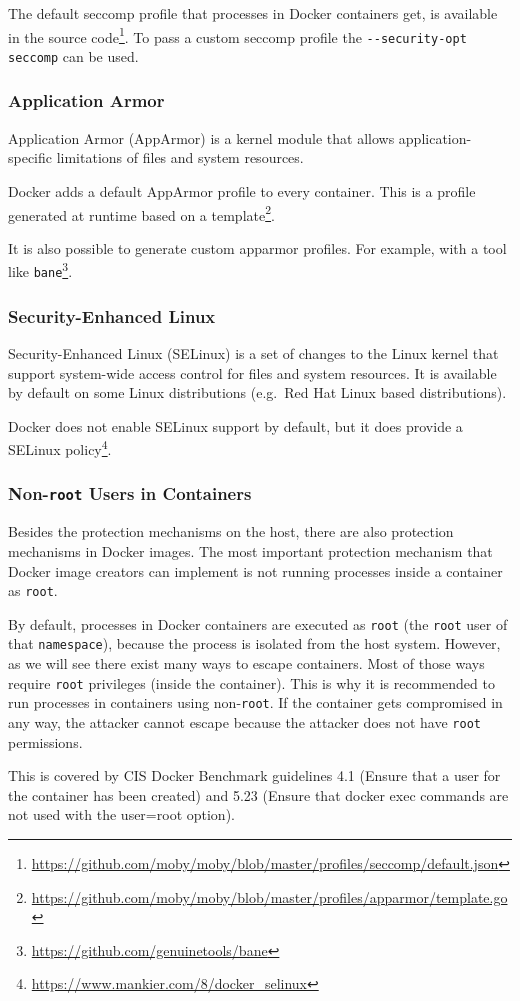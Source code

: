 \medskip

The default seccomp profile that processes in Docker containers get, is available in the source code\footnote{\url{https://github.com/moby/moby/blob/master/profiles/seccomp/default.json}}. To pass a custom seccomp profile the \lstinline{--security-opt seccomp} can be used.

\subsubsection{Application Armor}
Application Armor (AppArmor) is a kernel module that allows application-specific limitations of files and system resources.

Docker adds a default AppArmor profile to every container. This is a profile generated at runtime based on a template\footnote{\url{https://github.com/moby/moby/blob/master/profiles/apparmor/template.go}}.

\medskip

It is also possible to generate custom apparmor profiles. For example, with a tool like \lstinline{bane}\footnote{\url{https://github.com/genuinetools/bane}}.

\subsubsection{Security-Enhanced Linux}
Security-Enhanced Linux (SELinux) is a set of changes to the Linux kernel that support system-wide access control for files and system resources. It is available by default on some Linux distributions (e.g.\ Red Hat Linux based distributions).

\medskip

Docker does not enable SELinux support by default, but it does provide a SELinux policy\footnote{\url{https://www.mankier.com/8/docker_selinux}}.

\subsubsection{Non-\texorpdfstring{\lstinline{root}}{root} Users in Containers}\label{subsection:non-root-user}
Besides the protection mechanisms on the host, there are also protection mechanisms in Docker images. The most important protection mechanism that Docker image creators can implement is not running processes inside a container as \lstinline{root}.

By default, processes in Docker containers are executed as \lstinline{root} (the \lstinline{root} user of that \lstinline{namespace}), because the process is isolated from the host system. However, as we will see there exist many ways to escape containers. Most of those ways require \lstinline{root} privileges (inside the container). This is why it is recommended to run processes in containers using non-\lstinline{root}. If the container gets compromised in any way, the attacker cannot escape because the attacker does not have \lstinline{root} permissions.

\medskip

This is covered by CIS Docker Benchmark guidelines 4.1 (Ensure that a user for the container has been created) and 5.23 (Ensure that docker exec commands are not used with the user=root option).
